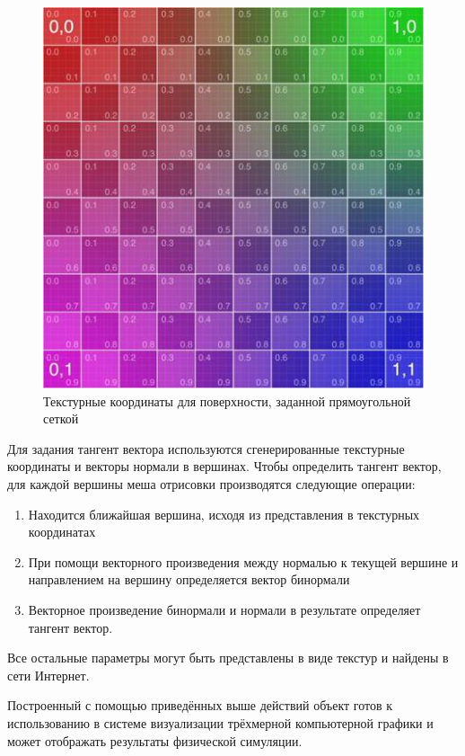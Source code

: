 	\begin{figure}[ht!] 
		\center
		\includegraphics [scale=0.9] {my_folder/images//texCoord}
		\caption{Текстурные координаты для поверхности, заданной прямоугольной сеткой}
		\label{fig:texCoord}  
	\end{figure}
	
	Для задания тангент вектора используются сгенерированные текстурные координаты и векторы нормали в вершинах. Чтобы определить тангент вектор, для каждой вершины меша отрисовки производятся следующие операции:
	\begin{enumerate}[1.]
		\item Находится ближайшая  вершина, исходя из представления в текстурных координатах
		\item При помощи векторного произведения между нормалью к текущей вершине и направлением на  вершину определяется вектор бинормали
		\item Векторное произведение бинормали и нормали в результате определяет тангент вектор.
	\end{enumerate}
	
	Все остальные параметры могут быть представлены в виде текстур и найдены в сети Интернет.
	
	Построенный с помощью приведённых выше действий объект готов к использованию в системе визуализации трёхмерной компьютерной графики и может отображать результаты физической симуляции.

%
